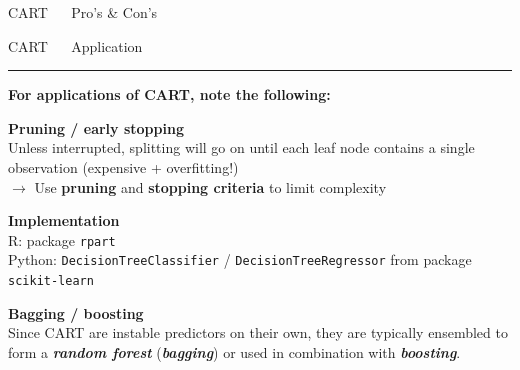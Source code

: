 \documentclass[11pt,compress,t,notes=noshow, xcolor=table]{beamer}
\begin{document}
\begin{frame}{\textcolor{gray!80}{CART} ~~ Pro's \& Con's}
\vfill

\small


\end{frame}


\LARGE
\begin{frame}{\textcolor{gray!80}{CART} ~~ Application}
\normalsize
\vspace{-0.5cm}
\noindent \textcolor{gray!80}{\rule{\textwidth}{1pt}}

\vspace{0.3cm}

\small

\textbf{For applications of CART, note the following:}
\lz

\textbf{\textcolor{gray!80}{Pruning / early stopping}} \\
\smallskip
Unless interrupted, splitting will go on until each leaf node contains a single 
observation (expensive + overfitting!) \\
\smallskip
$\rightarrow$ Use \textbf{pruning} and \textbf{stopping criteria} to limit 
complexity

\lz
\textbf{\textcolor{gray!80}{Implementation}} \\
\smallskip
R: package \texttt{rpart}\\
Python: \texttt{DecisionTreeClassifier} / \texttt{DecisionTreeRegressor} from 
package \texttt{scikit-learn}

\lz
\textbf{\textcolor{gray!80}{Bagging / boosting}} \\
\smallskip
Since CART are instable predictors on their own, they are typically ensembled
to form a \textit{\textbf{random forest}} (\textit{\textbf{bagging}}) or used in 
combination with \textit{\textbf{boosting}}.

\end{frame}

\end{document}
